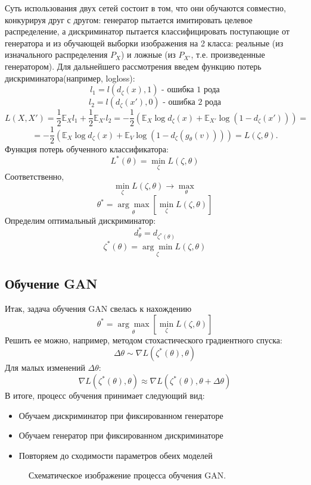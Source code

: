 		Суть использования двух сетей состоит в том, что они обучаются совместно, конкурируя друг с другом: генератор пытается имитировать целевое распределение, а дискриминатор пытается классифицировать поступающие от генератора и из обучающей выборки изображения на 2 класса: реальные (из изначального распределения $P_X$) и ложные (из $P_{X'}$, т.е. произведенные генератором).
		Для дальнейшего рассмотрения введем функцию потерь дискриминатора(например, logloss):
		$$ l_1 = l(d_{\zeta}(x), 1) \text{ - ошибка 1 рода} $$
		$$ l_2 = l(d_{\zeta}(x'), 0) \text{ - ошибка 2 рода}$$
		$$ L(X, X') = \frac{1}{2} \mathbb{E}_{X} l_1 + \frac{1}{2} \mathbb{E}_{X'} l_2 = -\frac{1}{2} (\mathbb{E}_{X} \log d_{\zeta}(x) + \mathbb{E}_{X'} \log (1 - d_{\zeta}(x'))) = $$
		$$ =  -\frac{1}{2} (\mathbb{E}_{X} \log d_{\zeta}(x) + \mathbb{E}_{V} \log (1 - d_{\zeta}(g_{\theta}(v)))) = L(\zeta, \theta) .$$
		Функция потерь обученного классификатора:
		$$ L^*(\theta) = \underset{\zeta}{\min} L(\zeta, \theta) $$
		Соответственно,
		$$ \underset{\zeta}{\min} L(\zeta, \theta) \longrightarrow \underset{\theta}{\max} $$
		$$ \theta^* = \underset{\theta}{\arg\max} \left[ \underset{\zeta}{\min} L(\zeta, \theta) \right] $$
		Определим оптимальный дискриминатор:
		$$ d^*_{\theta} = d_{\zeta^*(\theta)} $$
		$$ \zeta^*(\theta) =  \underset{\zeta}{\arg\min} L(\zeta, \theta)$$
	\subsection{Обучение GAN}
		Итак, задача обучения GAN свелась к нахождению
		$$ \theta^* = \underset{\theta}{\arg\max} \left[ \underset{\zeta}{\min} L(\zeta, \theta) \right] $$
		Решить ее можно, например, методом стохастического градиентного спуска:
		$$ \Delta \theta \sim \nabla L(\zeta^*(\theta), \theta)$$
		Для малых изменений $\Delta \theta$:
		$$ \nabla L(\zeta^*(\theta), \theta) \approx \nabla L(\zeta^*(\theta), \theta + \Delta \theta) $$
		В итоге, процесс обучения принимает следующий вид:
		\begin{itemize}
			\item Обучаем дискриминатор при фиксированном генераторе
			\item Обучаем генератор при фиксированном дискриминаторе
			\item Повторяем до сходимости параметров обеих моделей
		\end{itemize}
		\begin{figure}
			\caption{Схематическое изображение процесса обучения GAN.}
			\label{gan-training}
		\end{figure}
